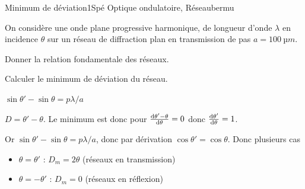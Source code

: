 


\begin{exercise}{Minimum de déviation}{1}{Spé}
{Optique ondulatoire, Réseau}{bermu}

On considère une onde plane progressive harmonique, de longueur d'onde $\lambda$ en incidence $\theta$ sur un réseau de diffraction plan en transmission de pas $a = \SI{100}{µm}$.

\begin{questions}
\questioncours Donner la relation fondamentale des réseaux.


\question Calculer le minimum de déviation du réseau.

\end{questions}
\end{exercise} 

\begin{solution}


\begin{questions}
\questioncours $\sin\theta' - \sin\theta = p\lambda/a$

\question $D = \theta' - \theta$. Le minimum est donc pour $\dv{\theta' - \theta}{\theta} = 0$ donc $\dv{\theta'}{\theta} = 1$.

Or $\sin\theta' - \sin\theta = p\lambda/a$, donc par dérivation $\cos\theta' = \cos\theta$. Donc plusieurs cas

\begin{itemize}
    \item $\theta = \theta'$ : $D_m = 2\theta$ (réseaux en transmission)
    \item $\theta = -\theta'$ : $D_m = 0$ (réseaux en réflexion)
\end{itemize}
\end{questions}

\end{solution}



